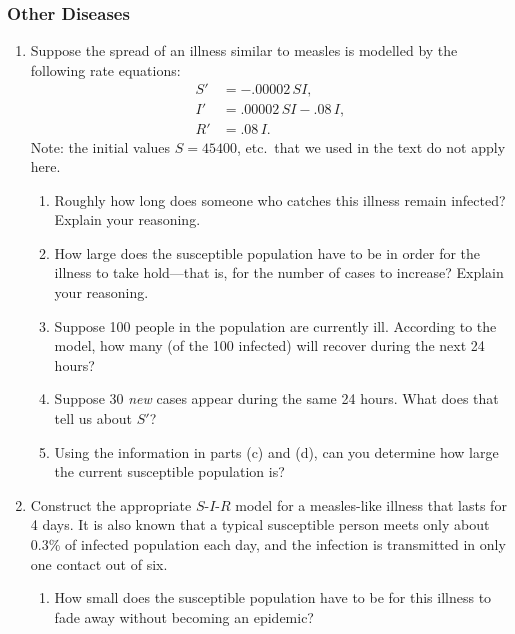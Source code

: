 \subsubsection{Other Diseases}
\label{subsubsec:other-diseases}




\begin{enumerate}
\item Suppose the spread of an illness similar to measles is modelled
by the following rate equations:
\begin{align*}
S' &= -.00002 \, SI, \\
I' &= .00002 \, SI - .08 \, I, \\
R' &= .08 \, I.
\end{align*}
Note: the initial values $S = 45400$, etc.\ that we used in the text
do not apply here.

  \begin{enumerate}
  \item Roughly how long does someone who catches this illness remain
infected?  Explain your reasoning.

  \item How large does the susceptible population have to be in order for
the illness to take hold---that is, for the number of cases to
increase?  Explain your reasoning.

  \item Suppose 100 people in the population are currently ill.
According to the model, how many (of the 100 infected) will recover
during the next 24 hours?

  \item Suppose 30 {\em new\/} cases appear during the same 24 hours.
What does that tell us about $S'$?

  \item Using the information in parts (c) and (d), can you determine how
large the current susceptible population is?


\end{enumerate}
\item Construct the appropriate $S$-$I$-$R$ model for a measles-like
illness that lasts for 4 days.  It is also known that a typical
susceptible person meets only about 0.3\% of infected population each
day, and the infection is transmitted in only one contact out of six.

  \begin{enumerate}
  \item How small does the susceptible population have to be for this
illness to fade away without becoming an epidemic?



\end{enumerate}
\end{enumerate}
